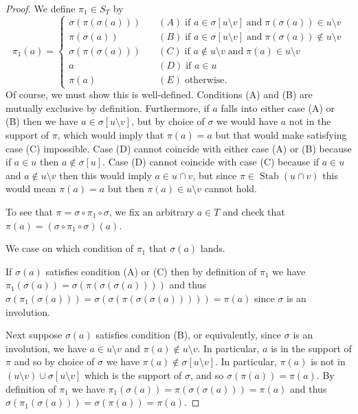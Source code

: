 \documentclass[12pt]{amsart}
\theoremstyle{plain}
\theoremstyle{definition}
\DeclareMathOperator{\Stab}{Stab}
\begin{document}
\begin{proof}

We define $\pi_1 \in S_T$ by
\begin{equation*}
\pi_1(a) = 
    \begin{cases}
        \sigma(\pi(\sigma(a))) & \quad (A) \; \text{if } a \in \sigma[u \setminus v] \; \text{and} \; \pi(\sigma(a)) \in u \setminus v\\
        \pi(\sigma(a)) & \quad (B) \; \text{if } a \in \sigma[u \setminus v] \; \text{and} \; \pi(\sigma(a)) \not\in u \setminus v\\
        \sigma(\pi(\sigma(a))) & \quad (C) \; \text{if } a\not\in u \setminus v \; \text{and} \; \pi(a) \in u \setminus v \\
        a & \quad (D) \; \text{if } a \in u\\
        \pi(a) & \quad (E) \; \text{otherwise}.
    \end{cases}
\end{equation*}
Of course, we must show this is well-defined.
Conditions (A) and (B) are mutually exclusive by definition.
Furthermore, if $a$ falls into either case (A) or (B) then we have $a \in \sigma[u \setminus v]$, but by choice of $\sigma$ we would have $a$ not in the support of $\pi$, which would imply that $\pi(a) = a$ but that would make satisfying case (C) impossible.
Case (D) cannot coincide with either case (A) or (B) because if $a \in u$ then $a \not\in \sigma[u]$.
Case (D) cannot coincide with case (C) because if $a \in u$ and $a \not\in u \setminus v$ then this would imply $a \in u \cap v$, but since $\pi \in \Stab(u \cap v)$ this would mean $\pi(a) = a$ but then $\pi(a) \in u \setminus v$ cannot hold.

To see that $\pi = \sigma \circ \pi_1 \circ \sigma$, we fix an arbitrary $a \in T$ and check that $\pi(a) = (\sigma \circ \pi_1 \circ \sigma)(a)$. 

We case on which condition of $\pi_1$ that $\sigma(a)$ lands.

If $\sigma(a)$ satisfies condition (A) or (C) then by definition of $\pi_1$ we have $\pi_1(\sigma(a)) = \sigma(\pi(\sigma(\sigma(a))))$ and thus $\sigma(\pi_1(\sigma(a))) = \sigma(\sigma(\pi(\sigma(\sigma(a))))) = \pi(a)$ since $\sigma$ is an involution.

Next suppose $\sigma(a)$ satisfies condition (B), or equivalently, since $\sigma$ is an involution, we have $a \in u \setminus v$ and $\pi(a) \not\in u \setminus v$.
In particular, $a$ is in the support of $\pi$ and so by choice of $\sigma$ we have $\pi(a) \not\in \sigma[u \setminus v]$.
In particular, $\pi(a)$ is not in $(u \setminus v) \cup \sigma[u \setminus v]$ which is the support of $\sigma$, and so $\sigma(\pi(a)) = \pi(a)$.
By definition of $\pi_1$ we have $\pi_1(\sigma(a)) = \pi(\sigma(\sigma(a))) = \pi(a)$ and thus $\sigma(\pi_1(\sigma(a))) = \sigma(\pi(a)) = \pi(a)$.


\end{proof}
\end{document}
